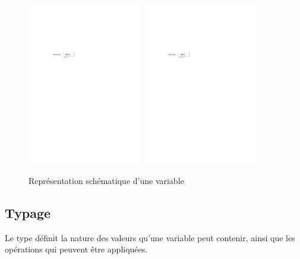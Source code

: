 \documentclass[a4paper,francais]{insalyon}
\begin{document}
\begin{figure}[htbp]
  \centering
  \includegraphics[width=5cm,page=1]{variable} \hspace{1cm}
  \includegraphics[width=5cm,page=2]{variable}
  \caption{Représentation schématique d'une variable}
  \label{fig:var}
\end{figure}

\subsection{Typage}

Le type définit la nature des valeurs qu'une variable peut contenir, ainsi que les opérations qui peuvent être appliquées. 
\end{document}
